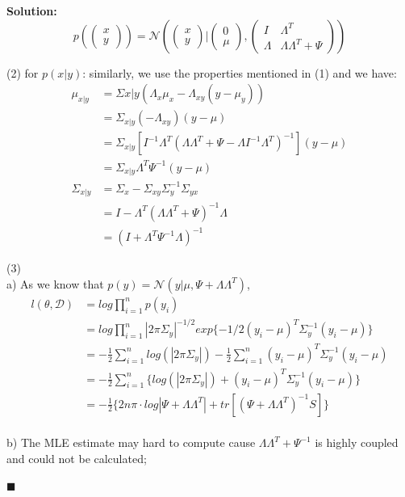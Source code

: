 \documentclass{article}
\newenvironment{solution}                               %
{\textbf{Solution:} \\}{$\blacksquare$\newline}         %
\newcommand{\Gaussian}{\mathcal{N}}                     %
\newcommand{\IdenMat}{\textit{I}}                       %
\begin{document}
\begin{solution}
        $$
        p(
            \begin{pmatrix}
                x \\ y
            \end{pmatrix}
        ) = 
        \Gaussian(
            \begin{pmatrix}
                x \\ y
            \end{pmatrix}
            |
            \begin{pmatrix}
                0 \\ \mu
            \end{pmatrix}
            ,
            \begin{pmatrix}
                \IdenMat & \Lambda^T \\
                \Lambda & \Lambda \Lambda^T + \Psi
            \end{pmatrix}
        )
        $$

        (2) for $p(x|y)$: similarly, we use the properties mentioned in (1) and we have:
        \begin{align*}
            \mu_{x|y} &= \Sigma{x|y}(\Lambda_{x}\mu_x-\Lambda_{xy}(y-\mu_y)) \\
            &= \Sigma_{x|y}(-\Lambda_{xy})(y-\mu) \\
            &= \Sigma_{x|y}[I^{-1} \Lambda^T (\Lambda \Lambda^T+\Psi-\Lambda I^{-1} \Lambda^T)^{-1}](y-\mu) \\
            &= \Sigma_{x|y} \Lambda^T \Psi^{-1}(y-\mu)
            \\
            \Sigma_{x|y} &= \Sigma_x - \Sigma_{xy} \Sigma_y^{-1} \Sigma_{yx} \\
            &= I - \Lambda^T (\Lambda \Lambda^T + \Psi)^{-1} \Lambda \\
            &= (I + \Lambda^T \Psi^{-1} \Lambda)^{-1}
        \end{align*}

        (3) \\
        a) As we know that $p(y) = \Gaussian(y|\mu, \Psi+\Lambda \Lambda^T)$,
        \begin{align*}
            l(\theta, \mathcal{D}) &= log \prod_{i=1}^{n}{p(y_i)} \\
            &= log \prod_{i=1}^{n} |2 \pi \Sigma_y|^{-1/2} exp\{-1/2 (y_i-\mu)^T \Sigma_y^{-1} (y_i-\mu)\} \\
            &= -\frac{1}{2} \sum_{i=1}^{n} log(|2 \pi \Sigma_y|)
               -\frac{1}{2} \sum_{i=1}^{n}{(y_i-\mu)^T \Sigma_y^{-1} (y_i-\mu)} \\
            &= -\frac{1}{2} \sum_{i=1}^{n} \{log(|2 \pi \Sigma_y|) + (y_i-\mu)^T \Sigma_y^{-1} (y_i-\mu)\} \\
            &= -\frac{1}{2} \{
                2n\pi \cdot log|\Psi+\Lambda \Lambda^T| + tr[(\Psi+\Lambda \Lambda^T)^{-1} S]
            \}
        \end{align*}
        \\
        b) The MLE estimate may hard to compute cause $\Lambda \Lambda^T + \Psi^{-1}$ is highly coupled and could not be calculated;


\end{solution}
\end{document}
